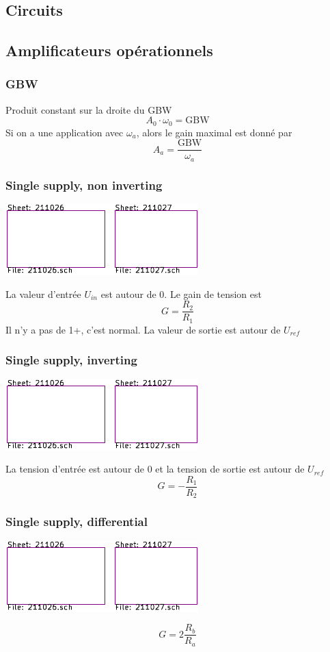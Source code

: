 \documentclass[]{article}
\begin{document}
\begin{multicols}{3}
\section{Circuits}
\subsection{Amplificateurs opérationnels}
\subsubsection{GBW}
Produit constant sur la droite du GBW
$$A_0\cdot \omega_0 = \text{GBW}$$
Si on a une application avec $\omega_a$, alors le gain maximal est donné par
$$A_a=\frac{\text{GBW}}{\omega_a}$$
\subsubsection{Single supply, non inverting}
\begin{center}
\includegraphics[width=0.7\columnwidth,page=3]{../KiCad/resume-crop.pdf}
\end{center}
La valeur d'entrée $U_{in}$ est autour de 0. Le gain de tension est
$$G=\frac{R_2}{R_1}$$
Il n'y a pas de 1+, c'est normal. La valeur de sortie est autour de $U_{ref}$
\subsubsection{Single supply, inverting}
\begin{center}
\includegraphics[width=0.7\columnwidth,page=4]{../KiCad/resume-crop.pdf}
\end{center}
La tension d'entrée est autour de 0 et la tension de sortie est autour de $U_{ref}$
$$G=-\frac{R_1}{R_2}$$
\subsubsection{Single supply, differential}
\begin{center}
\includegraphics[width=0.7\columnwidth,page=5]{../KiCad/resume-crop.pdf}
\end{center}
$$G=2\frac{R_b}{R_a}$$

\end{multicols}
\end{document}
